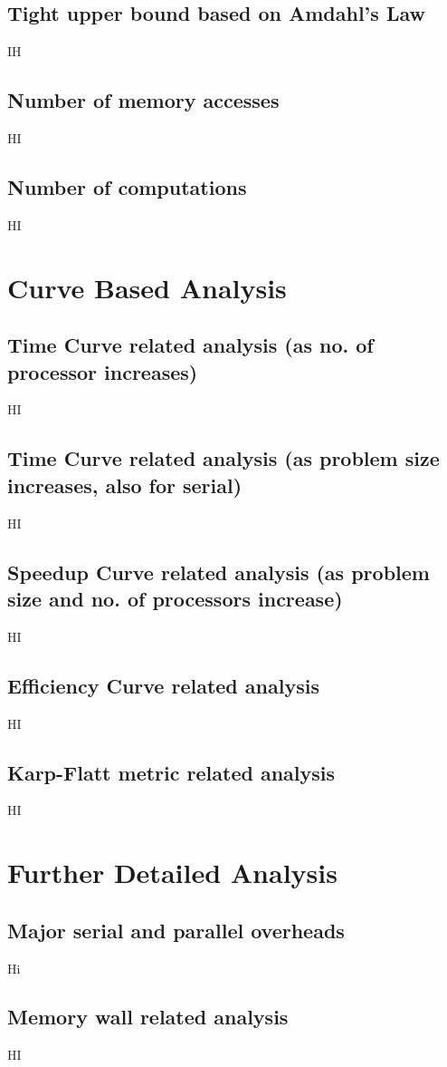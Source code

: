 \documentclass[runningheads, a4paper, oribibl]{llncs}
\begin{document}
\subsection{Tight upper bound based on Amdahl's Law}
IH
\subsection{Number of memory accesses}
HI
\subsection{Number of computations}
HI


        \section{Curve Based Analysis}
\subsection{Time Curve related analysis (as no. of processor increases)}
HI
\subsection{Time Curve related analysis (as problem size increases, also for serial)}
HI
\subsection{Speedup Curve related analysis (as problem size and no. of processors increase)}
HI
\subsection{Efficiency Curve related analysis}
HI
\subsection{Karp-Flatt metric related analysis}
HI

\section{Further Detailed Analysis}
\subsection{Major serial and parallel overheads}
Hi
\subsection{Memory wall related analysis}
HI
\end{document}
